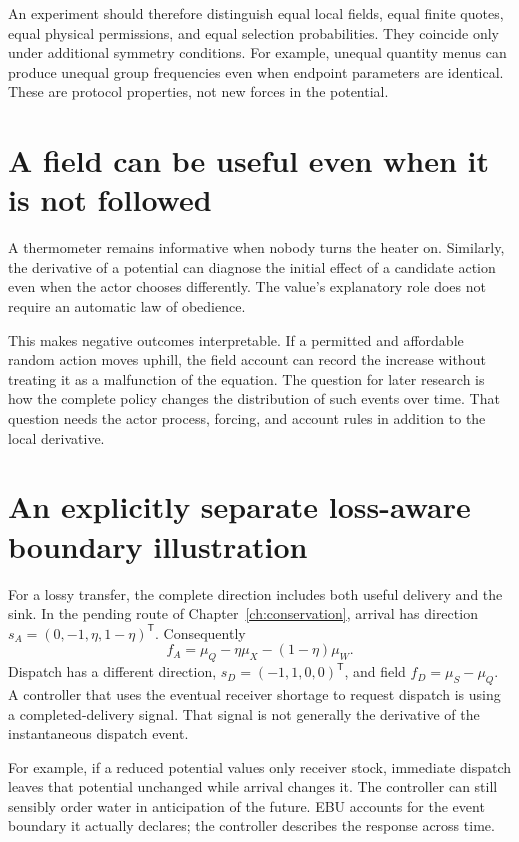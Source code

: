 An experiment should therefore distinguish equal local fields, equal finite quotes, equal physical permissions, and equal selection probabilities. They coincide only under additional symmetry conditions. For example, unequal quantity menus can produce unequal group frequencies even when endpoint parameters are identical. These are protocol properties, not new forces in the potential.

\section{A field can be useful even when it is not followed}
A thermometer remains informative when nobody turns the heater on. Similarly, the derivative of a potential can diagnose the initial effect of a candidate action even when the actor chooses differently. The value's explanatory role does not require an automatic law of obedience.

This makes negative outcomes interpretable. If a permitted and affordable random action moves uphill, the field account can record the increase without treating it as a malfunction of the equation. The question for later research is how the complete policy changes the distribution of such events over time. That question needs the actor process, forcing, and account rules in addition to the local derivative.

\section{An explicitly separate loss-aware boundary illustration}
For a lossy transfer, the complete direction includes both useful delivery and the sink. In the pending route of Chapter~\ref{ch:conservation}, arrival has direction $s_A=(0,-1,\eta,1-\eta)^{\mathsf T}$. Consequently
\begin{equation}
 f_A=\mu_Q-\eta\mu_X-(1-\eta)\mu_W.
\end{equation}
Dispatch has a different direction, $s_D=(-1,1,0,0)^{\mathsf T}$, and field $f_D=\mu_S-\mu_Q$. A controller that uses the eventual receiver shortage to request dispatch is using a completed-delivery signal. That signal is not generally the derivative of the instantaneous dispatch event.

For example, if a reduced potential values only receiver stock, immediate dispatch leaves that potential unchanged while arrival changes it. The controller can still sensibly order water in anticipation of the future. EBU accounts for the event boundary it actually declares; the controller describes the response across time.


